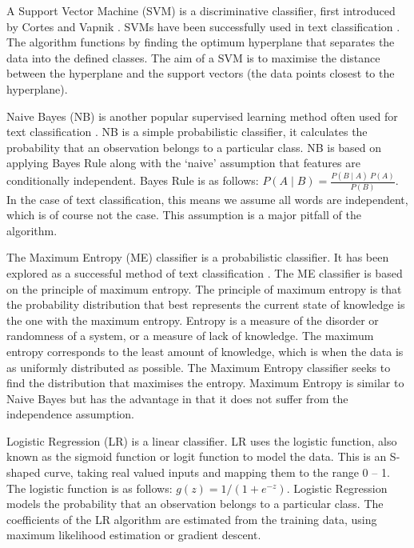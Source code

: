 A Support Vector Machine (SVM) is a discriminative classifier, first introduced by Cortes and Vapnik \cite{Vapnik1995,Vapnik21995}. SVMs have been successfully used in text classification \cite{Joachims1998}. The algorithm functions by finding the optimum hyperplane that separates the data into the defined classes. The aim of a SVM is to maximise the distance between the hyperplane and the support vectors (the data points closest to the hyperplane). 

Naive Bayes (NB) is another popular supervised learning method often used for text classification \cite{NaiveBayes1998}. NB is a simple probabilistic classifier, it calculates the probability that an observation belongs to a particular class. NB is based on applying Bayes Rule along with the ‘naive’ assumption that features are conditionally independent. Bayes Rule is as follows:  \(P(A\mid B)=\frac{P(B\mid A)\:P(A)}{P(B)}\). In the case of text classification, this means we assume all words are independent, which is of course not the case. This assumption is a major pitfall of the algorithm. 

The Maximum Entropy (ME) classifier is a probabilistic classifier. It has been explored as a successful method of text classification \cite{MaxEnt1999}. The ME classifier is based on the principle of maximum entropy.  The principle of maximum entropy is that the probability distribution that best represents the current state of knowledge is the one with the maximum entropy. Entropy is a measure of the disorder or randomness of a system, or a measure of lack of knowledge. The maximum entropy corresponds to the least amount of knowledge, which is when the data is as uniformly distributed as possible. The Maximum Entropy classifier seeks to find the distribution that maximises the entropy. Maximum Entropy is similar to Naive Bayes but has the advantage in that it does not suffer from the independence assumption.

Logistic Regression (LR) is a linear classifier. LR uses the logistic function, also known as the sigmoid function or logit function to model the data. This is an S-shaped curve, taking real valued inputs and mapping them to the range 0 – 1. The logistic function is as follows: \(g(z)=1/(1+e^{-z})\).
Logistic Regression models the probability that an observation belongs to a particular class. The coefficients of the LR algorithm are estimated from the training data, using maximum likelihood estimation or gradient descent.


